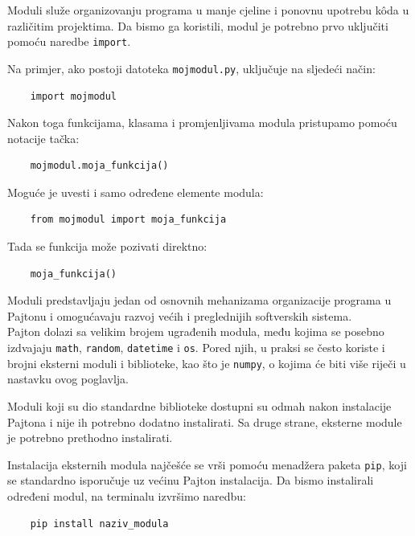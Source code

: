 Moduli služe organizovanju programa u manje cjeline i ponovnu upotrebu k\^oda u različitim projektima. Da bismo ga koristili, modul je potrebno prvo uključiti pomoću naredbe \texttt{import}.

Na primjer, ako postoji datoteka \texttt{mojmodul.py},  uključuje na sljedeći način:

\begin{verbatim}
	import mojmodul
\end{verbatim}

Nakon toga funkcijama, klasama i promjenljivama modula pristupamo pomoću notacije tačka:

\begin{verbatim}
	mojmodul.moja_funkcija()
\end{verbatim}

Moguće je uvesti i samo određene elemente modula:

\begin{verbatim}
	from mojmodul import moja_funkcija
\end{verbatim}

Tada se funkcija može pozivati direktno:

\begin{verbatim}
	moja_funkcija()
\end{verbatim}

Moduli predstavljaju jedan od osnovnih mehanizama organizacije programa u Pajtonu i omogućavaju razvoj većih i preglednijih softverskih sistema.\\


Pajton dolazi sa velikim brojem ugrađenih modula, među kojima se posebno izdvajaju \texttt{math}, \texttt{random}, \texttt{datetime} i \texttt{os}. Pored njih, u praksi se često koriste i brojni eksterni moduli i biblioteke, kao što je \texttt{numpy}, o kojima će biti više riječi u nastavku ovog poglavlja.

Moduli koji su dio standardne biblioteke dostupni su odmah nakon instalacije Pajtona i nije ih potrebno dodatno instalirati. Sa druge strane, eksterne module je potrebno prethodno instalirati.

Instalacija eksternih modula najčešće se vrši pomoću menadžera paketa \texttt{pip}, koji se standardno isporučuje uz većinu Pajton instalacija. Da bismo instalirali određeni modul, na terminalu izvršimo naredbu:

\begin{verbatim}
	pip install naziv_modula
\end{verbatim}

